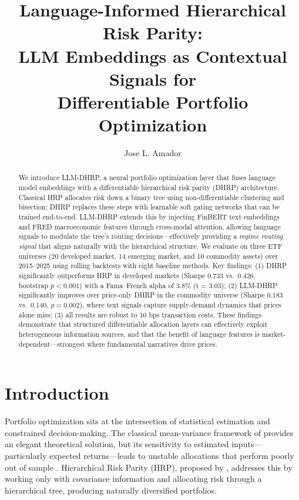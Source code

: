 \documentclass[11pt]{article}
\begin{document}
\title{Language-Informed Hierarchical Risk Parity:\\LLM Embeddings as Contextual Signals for\\Differentiable Portfolio Optimization}
\author{Jose L. Amador}
\date{}
\maketitle

\begin{abstract}
We introduce LLM-DHRP, a neural portfolio optimization layer that fuses language model embeddings with a differentiable hierarchical risk parity (DHRP) architecture. Classical HRP allocates risk down a binary tree using non-differentiable clustering and bisection; DHRP replaces these steps with learnable soft gating networks that can be trained end-to-end. LLM-DHRP extends this by injecting FinBERT text embeddings and FRED macroeconomic features through cross-modal attention, allowing language signals to modulate the tree's routing decisions---effectively providing a \emph{regime routing signal} that aligns naturally with the hierarchical structure. We evaluate on three ETF universes (20 developed market, 14 emerging market, and 10 commodity assets) over 2015--2025 using rolling backtests with eight baseline methods. Key findings: (1) DHRP significantly outperforms HRP in developed markets (Sharpe 0.733 vs.\ 0.426, bootstrap $p < 0.001$) with a Fama--French alpha of 3.8\% (t = 3.03); (2) LLM-DHRP significantly improves over price-only DHRP in the commodity universe (Sharpe 0.183 vs.\ 0.140, $p = 0.002$), where text signals capture supply-demand dynamics that prices alone miss; (3) all results are robust to 10 bps transaction costs. These findings demonstrate that structured differentiable allocation layers can effectively exploit heterogeneous information sources, and that the benefit of language features is market-dependent---strongest where fundamental narratives drive prices.
\end{abstract}

\section{Introduction}

Portfolio optimization sits at the intersection of statistical estimation and constrained decision-making. The classical mean-variance framework of \citet{Markowitz1952} provides an elegant theoretical solution, but its sensitivity to estimated inputs---particularly expected returns---leads to unstable allocations that perform poorly out of sample \citep{DeMiguel2009}. Hierarchical Risk Parity (HRP), proposed by \citet{LopezdePrado2016}, addresses this by working only with covariance information and allocating risk through a hierarchical tree, producing naturally diversified portfolios.
\end{document}
